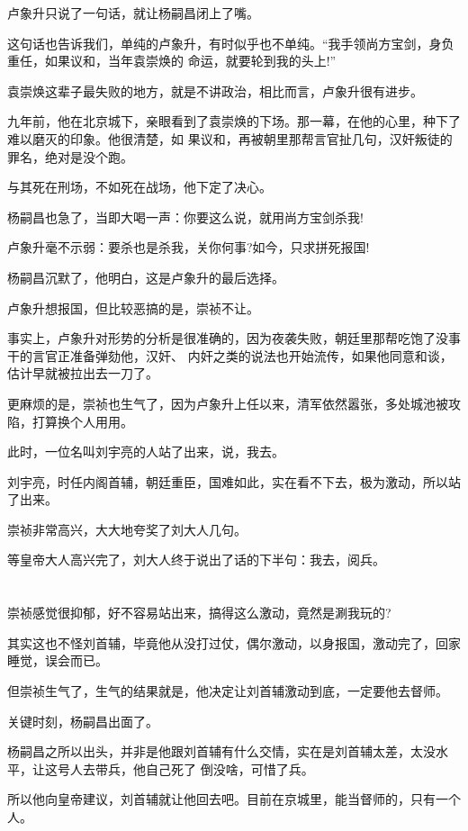 \documentclass[11pt,a4paper,onecolumn]{article}
\begin{document}
卢象升只说了一句话，就让杨嗣昌闭上了嘴。

这句话也告诉我们，单纯的卢象升，有时似乎也不单纯。``我手领尚方宝剑，身负重任，如果议和，当年袁崇焕的
命运，就要轮到我的头上!''

袁崇焕这辈子最失败的地方，就是不讲政治，相比而言，卢象升很有进步。

九年前，他在北京城下，亲眼看到了袁崇焕的下场。那一幕，在他的心里，种下了难以磨灭的印象。他很清楚，如
果议和，再被朝里那帮言官扯几句，汉奸叛徒的罪名，绝对是没个跑。

与其死在刑场，不如死在战场，他下定了决心。

杨嗣昌也急了，当即大喝一声：你要这么说，就用尚方宝剑杀我!

卢象升毫不示弱：要杀也是杀我，关你何事?如今，只求拼死报国!

杨嗣昌沉默了，他明白，这是卢象升的最后选择。

卢象升想报国，但比较恶搞的是，崇祯不让。

事实上，卢象升对形势的分析是很准确的，因为夜袭失败，朝廷里那帮吃饱了没事干的言官正准备弹劾他，汉奸、
内奸之类的说法也开始流传，如果他同意和谈，估计早就被拉出去一刀了。

更麻烦的是，崇祯也生气了，因为卢象升上任以来，清军依然嚣张，多处城池被攻陷，打算换个人用用。

此时，一位名叫刘宇亮的人站了出来，说，我去。

刘宇亮，时任内阁首辅，朝廷重臣，国难如此，实在看不下去，极为激动，所以站了出来。

崇祯非常高兴，大大地夸奖了刘大人几句。

等皇帝大人高兴完了，刘大人终于说出了话的下半句：我去，阅兵。

\section[\thesection]{}

崇祯感觉很抑郁，好不容易站出来，搞得这么激动，竟然是涮我玩的?

其实这也不怪刘首辅，毕竟他从没打过仗，偶尔激动，以身报国，激动完了，回家睡觉，误会而已。

但崇祯生气了，生气的结果就是，他决定让刘首辅激动到底，一定要他去督师。

关键时刻，杨嗣昌出面了。

杨嗣昌之所以出头，并非是他跟刘首辅有什么交情，实在是刘首辅太差，太没水平，让这号人去带兵，他自己死了
倒没啥，可惜了兵。

所以他向皇帝建议，刘首辅就让他回去吧。目前在京城里，能当督师的，只有一个人。
\end{document}
